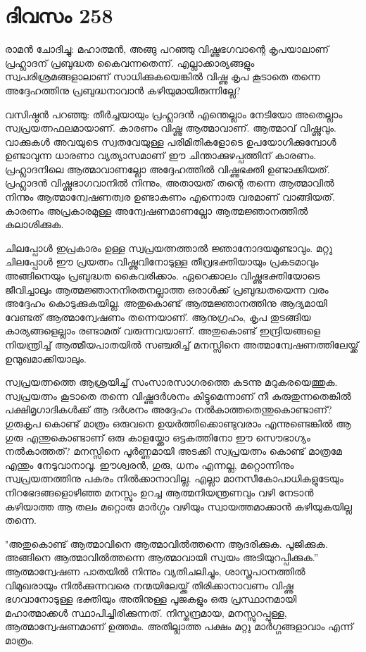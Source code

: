 \section{ദിവസം 258}


രാമന്‍ ചോദിച്ചു: മഹാത്മന്‍, അങ്ങു പറഞ്ഞു വിഷ്ണുഭഗവാന്റെ കൃപയാലാണ് പ്രഹ്ലാദന് പ്രബുദ്ധത കൈവന്നതെന്ന്. എല്ലാക്കാര്യങ്ങളും സ്വപരിശ്രമങ്ങളാലാണ് സാധിക്കുകയെങ്കില്‍ വിഷ്ണു കൃപ കൂടാതെ തന്നെ അദ്ദേഹത്തിനു പ്രബുദ്ധനാവാന്‍ കഴിയുമായിരുന്നില്ലേ?

വസിഷ്ഠന്‍ പറഞ്ഞു: തീര്‍ച്ചയായും പ്രഹ്ലാദന്‍ എന്തെല്ലാം നേടിയോ അതെല്ലാം സ്വപ്രയത്നഫലമായാണ്. കാരണം വിഷ്ണു ആത്മാവാണ്. ആത്മാവ് വിഷ്ണുവും. വാക്കുകള്‍ അവയുടെ സ്വതവേയുള്ള പരിമിതികളോടെ ഉപയോഗിക്കുമ്പോള്‍ ഉണ്ടാവുന്ന ധാരണാ വ്യത്യാസമാണ് ഈ ചിന്താക്കുഴപ്പത്തിന് കാരണം. പ്രഹ്ലാദനിലെ ആത്മാവാണല്ലോ അദ്ദേഹത്തില്‍ വിഷ്ണുഭക്തി ഉണ്ടാക്കിയത്. പ്രഹ്ലാദന്‍ വിഷ്ണുഭാഗവാനില്‍ നിന്നും, അതായത് തന്റെ തന്നെ ആത്മാവില്‍ നിന്നും ആത്മാന്വേഷണത്വര ഉണ്ടാകണം എന്നൊരു വരമാണ്  വാങ്ങിയത്. കാരണം അപ്രകാരമുള്ള അന്വേഷണമാണല്ലോ ആത്മജ്ഞാനത്തില്‍ കലാശിക്കുക.

ചിലപ്പോള്‍ ഇപ്രകാരം ഉള്ള സ്വപ്രയത്നത്താല്‍ ജ്ഞാനോദയമുണ്ടാവും. മറ്റു ചിലപ്പോള്‍ ഈ പ്രയത്നം വിഷ്ണുവിനോടുള്ള തീവ്രഭക്തിയായും പ്രകടമാവും അങ്ങിനെയും പ്രബുദ്ധത കൈവരിക്കാം. ഏറെക്കാലം വിഷ്ണുഭക്തിയോടെ ജീവിച്ചാലും ആത്മജ്ഞാനനിരതനല്ലാത്ത ഒരാള്‍ക്ക് പ്രബുദ്ധതയെന്ന വരം അദ്ദേഹം കൊടുക്കുകയില്ല. അതുകൊണ്ട് ആത്മജ്ഞാനത്തിനു ആദ്യമായി വേണ്ടത് ആത്മാന്വേഷണം തന്നെയാണ്. ആനുഗ്രഹം, കൃപ തുടങ്ങിയ കാര്യങ്ങളെല്ലാം രണ്ടാമത് വരുന്നവയാണ്. അതുകൊണ്ട് ഇന്ദ്രിയങ്ങളെ നിയന്ത്രിച്ച് ആത്മീയപാതയില്‍ സഞ്ചരിച്ച് മനസ്സിനെ അത്മാന്വേഷണത്തിലേയ്ക്ക് ഉന്മുഖമാക്കിയാലും.

സ്വപ്രയത്നത്തെ ആശ്രയിച്ച് സംസാരസാഗരത്തെ കടന്നു മറുകരയെത്തുക. സ്വപ്രയത്നം കൂടാതെ തന്നെ വിഷ്ണുദര്‍ശനം കിട്ടുമെന്നാണ് നീ കരുതുന്നതെങ്കില്‍ പക്ഷിമൃഗാദികള്‍ക്ക് ആ ദര്‍ശനം അദ്ദേഹം നല്‍കാത്തതെന്തുകൊണ്ടാണ്? ഗുരുകൃപ കൊണ്ട് മാത്രം ഒരുവനെ ഉയര്‍ത്തിക്കൊണ്ടുവരാം എന്നുണ്ടെങ്കില്‍ ആ ഗുരു എന്തുകൊണ്ടാണ് ഒരു കാളയ്ക്കോ ഒട്ടകത്തിനോ ഈ സൌഭാഗ്യം നല്‍കാത്തത്? മനസ്സിനെ പൂര്‍ണ്ണമായി അടക്കി സ്വപ്രയത്നം കൊണ്ട് മാത്രമേ എന്തും നേടുവാനാവൂ. ഈശ്വരന്‍, ഗുരു, ധനം എന്നല്ല, മറ്റൊന്നിനും സ്വപ്രയത്നത്തിനു പകരം നില്‍ക്കാനാവില്ല. എല്ലാ മാനസീകോപാധികളുടേയും നിറഭേദങ്ങളൊഴിഞ്ഞ മനസ്സും ഉറച്ച ആത്മനിയന്ത്രണവും വഴി നേടാന്‍ കഴിയാത്ത ആ തലം മറ്റൊരു മാര്‍ഗ്ഗം വഴിയും സ്വായത്തമാക്കാന്‍ കഴിയുകയില്ല തന്നെ.

"അതുകൊണ്ട് ആത്മാവിനെ ആത്മാവില്‍ത്തന്നെ ആദരിക്കുക. പൂജിക്കുക. അങ്ങിനെ ആത്മാവില്‍ത്തന്നെ ആത്മാവായി സ്വയം അടിയുറപ്പിക്കുക.” ആത്മാന്വേഷണ പാതയില്‍ നിന്നും വ്യതിചലിച്ചും, ശാസ്ത്രപഠനത്തില്‍ വിമുഖരായും നില്‍ക്കുന്നവരെ നന്മയിലേയ്ക്ക് തിരിക്കാനാവണം വിഷ്ണു ഭഗവാനോടുള്ള ഭക്തിയും അതിനുള്ള പൂജകളും ഒരു പ്രസ്ഥാനമായി മഹാത്മാക്കള്‍ സ്ഥാപിച്ചിരിക്കുന്നത്. നിസ്തന്ദ്രമായ, മനസ്സുറപ്പുള്ള, ആത്മാന്വേഷണമാണ് ഉത്തമം. അതില്ലാത്ത പക്ഷം മറ്റു മാര്‍ഗ്ഗങ്ങളാവാം എന്ന് മാത്രം.  

